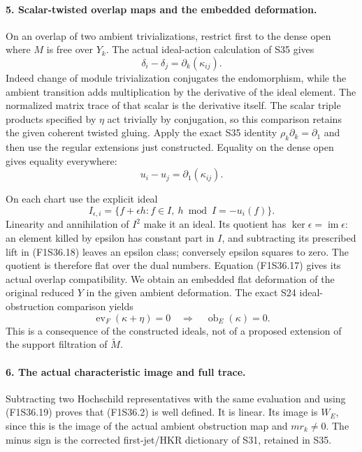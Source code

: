 \paragraph{5. Scalar-twisted overlap maps and the embedded deformation.}
On an overlap of two ambient trivializations,
restrict first to the dense open where $M$ is
free over $Y_k$.
The actual ideal-action calculation of S35 gives
\[
        \delta_i-\delta_j=\partial_k(\kappa_{ij}).
 \tag{F1S36.16}
\]
Indeed change of module trivialization conjugates
the endomorphism, while the ambient transition
adds multiplication by the derivative of the
ideal element. The normalized matrix trace
of that scalar is the derivative itself.
The scalar triple products specified by $\eta$
act trivially by conjugation, so this comparison
retains the given coherent twisted gluing.
Apply the exact S35 identity
$\rho_k\partial_k=\partial_1$ and then use the
regular extensions just constructed. Equality
on the dense open gives equality everywhere:
\[
                  u_i-u_j=\partial_1(\kappa_{ij}).
 \tag{F1S36.17}
\]

On each chart use the explicit ideal
\[
 I_{\epsilon,i}=\{f+\epsilon h: f\in I,
                         \ h\bmod I=-u_i(f)\}.
 \tag{F1S36.18}
\]
Linearity and annihilation of $I^2$ make it an
ideal. Its quotient has
$\ker\epsilon=\operatorname{im}\epsilon$:
an element killed by epsilon has constant part
in $I$, and subtracting its prescribed lift in
(F1S36.18) leaves an epsilon class; conversely
epsilon squares to zero.
The quotient is therefore flat over the dual
numbers. Equation (F1S36.17) gives its actual
overlap compatibility. We obtain an embedded
flat deformation of the original reduced
$Y$ in the given ambient deformation.
The exact S24 ideal-obstruction comparison yields
\[
 \operatorname{ev}_F(\kappa+\eta)=0
                 \quad\Longrightarrow\quad
                         \operatorname{ob}_E(\kappa)=0.
 \tag{F1S36.19}
\]
This is a consequence of the constructed ideals,
not of a proposed extension of the support
filtration of $\widetilde M$.

\paragraph{6. The actual characteristic image and full trace.}
Subtracting two Hochschild representatives with
the same evaluation and using (F1S36.19) proves
that (F1S36.2) is well defined. It is linear.
Its image is $W_E$, since this is the image of
the actual ambient obstruction map and
$m r_k\ne0$.
The minus sign is the corrected first-jet/HKR
dictionary of S31, retained in S35.

